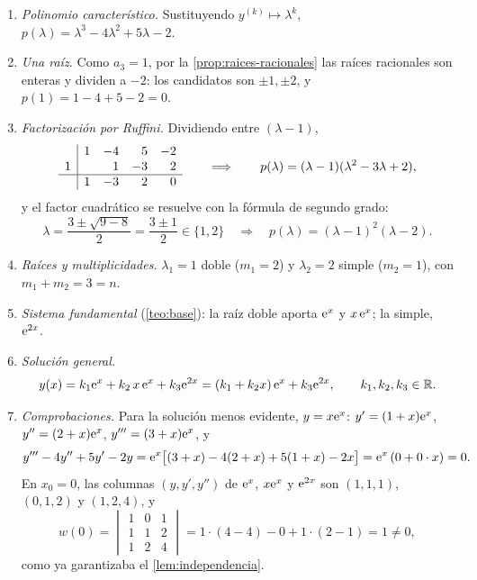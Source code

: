 \begin{ejemplo}[$y'''-4y''+5y'-2y=0$ \cite{TEMARIO}]\label{ej:triple}
\leavevmode
\begin{enumerate}[label=\textcolor{cian}{\arabic*.}, leftmargin=1.5em, itemsep=4pt]
  \item \emph{Polinomio característico.} Sustituyendo $y^{(k)}\mapsto\lambda^{k}$,
        $p(\lambda)=\lambda^{3}-4\lambda^{2}+5\lambda-2$.
  \item \emph{Una raíz.} Como $a_3=1$, por la \cref{prop:raices-racionales}
        las raíces racionales son enteras y dividen a $-2$: los candidatos
        son $\pm1,\pm2$, y $p(1)=1-4+5-2=0$.
  \item \emph{Factorización por Ruffini.} Dividiendo entre $(\lambda-1)$,
        \[
          \begin{array}{r|rrrr}
             & 1 & -4 & 5 & -2\\
           1 &   & 1 & -3 & 2\\\hline
             & 1 & -3 & 2 & 0
          \end{array}
          \qquad\Longrightarrow\qquad
          p(\lambda)=(\lambda-1)(\lambda^{2}-3\lambda+2),
        \]
        y el factor cuadrático se resuelve con la fórmula de segundo grado:
        \[
          \lambda=\frac{3\pm\sqrt{9-8}}{2}=\frac{3\pm1}{2}\in\{1,2\}
          \quad\Longrightarrow\quad
          p(\lambda)=(\lambda-1)^{2}(\lambda-2).
        \]
  \item \emph{Raíces y multiplicidades.} $\lambda_1=1$ doble ($m_1=2$) y
        $\lambda_2=2$ simple ($m_2=1$), con $m_1+m_2=3=n$.
  \item \emph{Sistema fundamental} (\cref{teo:base}): la raíz doble aporta
        $\mathrm{e}^{x}$ y $x\,\mathrm{e}^{x}$; la simple, $\mathrm{e}^{2x}$.
  \item \emph{Solución general.}
        \begin{equation}\label{eq:ej-triple}
          y(x)=k_1\mathrm{e}^{x}+k_2\,x\,\mathrm{e}^{x}+k_3\mathrm{e}^{2x}=(k_1+k_2x)\,\mathrm{e}^{x}+k_3\mathrm{e}^{2x},
          \qquad k_1,k_2,k_3\in\mathbb{R} .
        \end{equation}
  \item \emph{Comprobaciones.} Para la solución menos evidente, $y=x\mathrm{e}^{x}$:
        $y'=(1+x)\mathrm{e}^{x}$, $y''=(2+x)\mathrm{e}^{x}$, $y'''=(3+x)\mathrm{e}^{x}$, y
        \[
          y'''-4y''+5y'-2y=\mathrm{e}^{x}\bigl[(3+x)-4(2+x)+5(1+x)-2x\bigr]=\mathrm{e}^{x}\,(0+0\cdot x)=0 .
        \]
        En $x_0=0$, las columnas $(y,y',y'')$ de $\mathrm{e}^{x}$, $x\mathrm{e}^{x}$ y
        $\mathrm{e}^{2x}$ son $(1,1,1)$, $(0,1,2)$ y $(1,2,4)$, y
        \[
          w(0)=\begin{vmatrix}1&0&1\\1&1&2\\1&2&4\end{vmatrix}
              =1\cdot(4-4)-0+1\cdot(2-1)=1\neq0 ,
        \]
        como ya garantizaba el \cref{lem:independencia}.
\end{enumerate}
\end{ejemplo}

